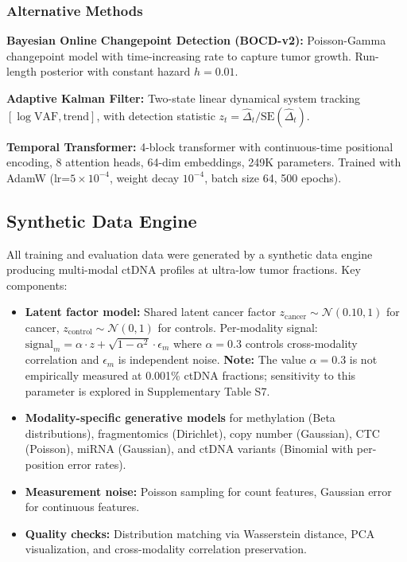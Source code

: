 \documentclass[10pt,a4paper]{article}
\begin{document}
\subsubsection{Alternative Methods}

\textbf{Bayesian Online Changepoint Detection (BOCD-v2):} Poisson-Gamma changepoint model with time-increasing rate to capture tumor growth. Run-length posterior with constant hazard $h = 0.01$.

\textbf{Adaptive Kalman Filter:} Two-state linear dynamical system tracking $[\log \text{VAF}, \text{trend}]$, with detection statistic $z_t = \hat{\Delta}_t / \text{SE}(\hat{\Delta}_t)$.

\textbf{Temporal Transformer:} 4-block transformer with continuous-time positional encoding, 8 attention heads, 64-dim embeddings, 249K parameters. Trained with AdamW (lr=$5\times10^{-4}$, weight decay $10^{-4}$, batch size 64, 500 epochs).

\subsection{Synthetic Data Engine}

All training and evaluation data were generated by a synthetic data engine producing multi-modal ctDNA profiles at ultra-low tumor fractions. Key components:

\begin{itemize}
\item \textbf{Latent factor model:} Shared latent cancer factor $z_{\text{cancer}} \sim \mathcal{N}(0.10, 1)$ for cancer, $z_{\text{control}} \sim \mathcal{N}(0, 1)$ for controls. Per-modality signal: $\text{signal}_m = \alpha \cdot z + \sqrt{1-\alpha^2} \cdot \epsilon_m$ where $\alpha = 0.3$ controls cross-modality correlation and $\epsilon_m$ is independent noise. \textbf{Note:} The value $\alpha = 0.3$ is not empirically measured at 0.001\% ctDNA fractions; sensitivity to this parameter is explored in Supplementary Table S7.
\item \textbf{Modality-specific generative models} for methylation (Beta distributions), fragmentomics (Dirichlet), copy number (Gaussian), CTC (Poisson), miRNA (Gaussian), and ctDNA variants (Binomial with per-position error rates).
\item \textbf{Measurement noise:} Poisson sampling for count features, Gaussian error for continuous features.
\item \textbf{Quality checks:} Distribution matching via Wasserstein distance, PCA visualization, and cross-modality correlation preservation.
\end{itemize}
\end{document}
